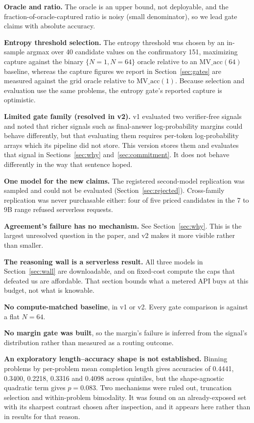 \documentclass{article}
\begin{document}
\textbf{Oracle and ratio.} The oracle is an upper bound, not deployable, and
the fraction-of-oracle-captured ratio is noisy (small denominator), so we lead
gate claims with absolute accuracy.

\textbf{Entropy threshold selection.} The entropy threshold was chosen by an
in-sample argmax over 40 candidate values on the confirmatory 151, maximizing
capture against the binary $\{N=1, N=64\}$ oracle relative to an
$\text{MV\_acc}(64)$ baseline, whereas the capture figures we report in
Section~\ref{sec:gates} are measured against the grid oracle relative to
$\text{MV\_acc}(1)$. Because selection and evaluation use the same problems,
the entropy gate's reported capture is optimistic.

\textbf{Limited gate family (resolved in v2).} v1 evaluated two verifier-free
signals and noted that richer signals such as final-answer log-probability
margins could behave differently, but that evaluating them requires per-token
log-probability arrays which its pipeline did not store. This version stores
them and evaluates that signal in Sections~\ref{sec:why}
and~\ref{sec:commitment}. It does not behave differently in the way that
sentence hoped.

\textbf{One model for the new claims.} The registered second-model replication
was sampled and could not be evaluated (Section~\ref{sec:rejected}).
Cross-family replication was never purchasable either: four of five priced
candidates in the 7 to 9B range refused serverless requests.

\textbf{Agreement's failure has no mechanism.} See Section~\ref{sec:why}. This
is the largest unresolved question in the paper, and v2 makes it more visible
rather than smaller.

\textbf{The reasoning wall is a serverless result.} All three models in
Section~\ref{sec:wall} are downloadable, and on fixed-cost compute the caps
that defeated us are affordable. That section bounds what a metered API buys at
this budget, not what is knowable.

\textbf{No compute-matched baseline}, in v1 or v2. Every gate comparison is
against a flat $N=64$.

\textbf{No margin gate was built}, so the margin's failure is inferred from the
signal's distribution rather than measured as a routing outcome.

\textbf{An exploratory length--accuracy shape is not established.} Binning
problems by per-problem mean completion length gives accuracies of 0.4441,
0.3400, 0.2218, 0.3316 and 0.4098 across quintiles, but the shape-agnostic
quadratic term gives $p = 0.083$. Two mechanisms were ruled out, truncation
selection and within-problem bimodality. It was found on an already-exposed set
with its sharpest contrast chosen after inspection, and it appears here rather
than in results for that reason.
\end{document}
